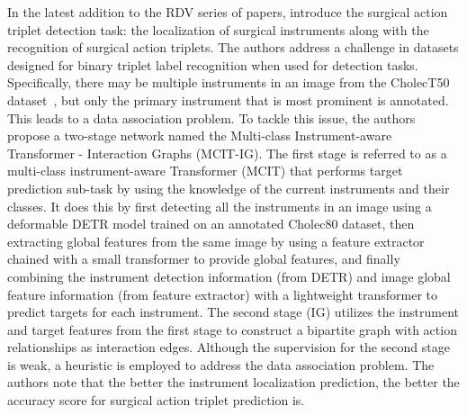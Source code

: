 In the latest addition to the RDV series of papers, \citet{sharma2023surgical} introduce the surgical action triplet detection task: the localization of surgical instruments along with the recognition of surgical action triplets. 
The authors address a challenge in datasets designed for binary triplet label recognition when used for detection tasks.
Specifically, there may be multiple instruments in an image from the CholecT50 dataset~\citep{NWOYE2022102433_rendevous}, but only the primary instrument that is most prominent is annotated. This leads to a data association problem. 
To tackle this issue, the authors propose a two-stage network named the Multi-class Instrument-aware Transformer - Interaction Graphs (MCIT-IG). The first stage is referred to as a multi-class instrument-aware Transformer (MCIT) that performs target prediction sub-task by using the knowledge of the current instruments and their classes. It does this by first detecting all the instruments in an image using a deformable DETR model \citep{zhu2021deformable} trained on an annotated Cholec80 dataset, then extracting global features from the same image by using a feature extractor chained with a small transformer to provide global features, and finally combining the instrument detection information (from DETR) and image global feature information (from feature extractor) with a lightweight transformer to predict targets for each instrument. 
The second stage (IG) utilizes the instrument and target features from the first stage to construct a bipartite graph with action relationships as interaction edges. Although the supervision for the second stage is weak, a heuristic is employed to address the data association problem.
The authors note that the better the instrument localization prediction, the better the accuracy score for surgical action triplet prediction is. \newline

